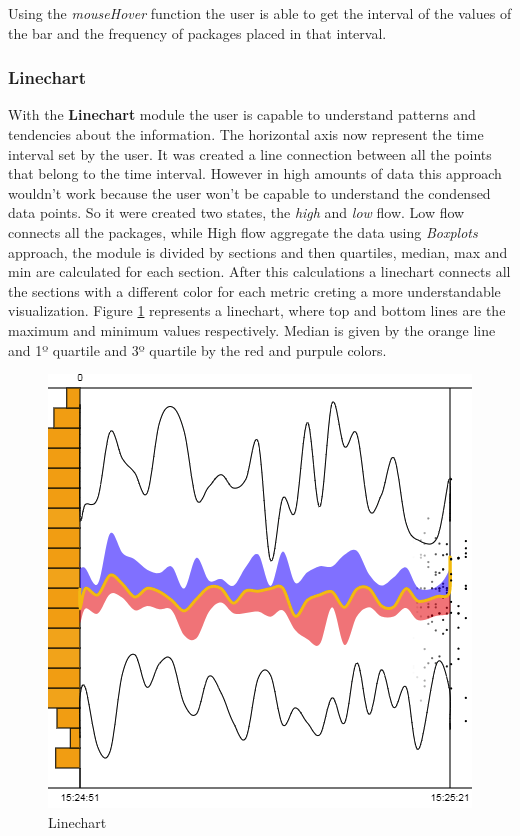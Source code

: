 \documentclass[letterpaper, 10 pt, conference]{ieeeconf}  %
\begin{document}
Using the \textit{mouseHover} function the user is able to get the interval of the values of the bar and the frequency of packages placed in that interval.

\subsubsection{Linechart}
\label{subsubsection:linechart}
With the \textbf{Linechart} module the user is capable to understand patterns and tendencies about the information. The horizontal axis now represent the time interval set by the user. It was created a line connection between all the points that belong to the time interval. However in high amounts of data this approach wouldn't work because the user won't be capable to understand the condensed data points. So it were created two states, the \textit{high} and \textit{low} flow. Low flow connects all the packages, while High flow aggregate the data using \textit{Boxplots} approach, the module is divided by sections and then quartiles, median, max and min are calculated for each section. After this calculations a linechart connects all the sections with a different color for each metric creting a more understandable visualization. Figure \ref{fig:linechart} represents a linechart, where top and bottom lines are the maximum and minimum values respectively. Median is given by the orange line and 1º quartile and 3º quartile by the red and purpule colors.

\begin{figure}[ht]
    \centering
    \includegraphics[width=0.8\linewidth]{Figures/linechart.png}
    \caption{Linechart}
        \label{fig:linechart}
\end{figure}
\end{document}
